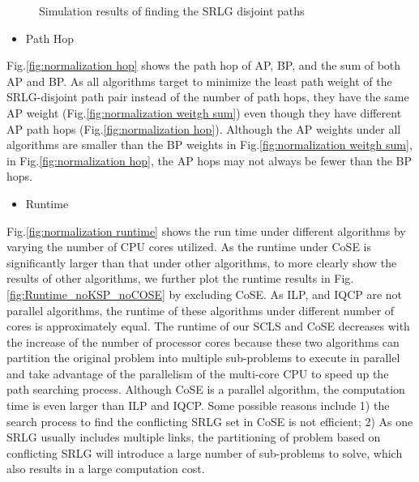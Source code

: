 \begin{figure}[tp]
\caption{Simulation results of finding the SRLG disjoint paths}
\label{fig:SLNGExperimentalData}
\end{figure}

\begin{itemize}
  \item Path Hop
\end{itemize}


Fig.\ref{fig:normalization hop} shows the path hop of AP, BP, and the sum of both AP and BP. As all algorithms target to minimize the least path weight of the SRLG-disjoint path pair instead of the number of path hops, they have the same AP weight (Fig.\ref{fig:normalization weitgh sum}) even though they have different AP path hops (Fig.\ref{fig:normalization hop}). Although the AP weights under all algorithms are smaller than the BP weights in Fig.\ref{fig:normalization weitgh sum}, in Fig.\ref{fig:normalization hop}, the AP hops may not always be fewer than the BP hops.

\begin{itemize}
  \item Runtime
\end{itemize}


\label{subsubsec:Runtime}
Fig.\ref{fig:normalization runtime} shows the run time under different algorithms by varying the number of CPU cores utilized.
As the runtime under CoSE is significantly larger than that under other algorithms, to more clearly show the results of other algorithms, we further plot the runtime results in Fig.\ref{fig:Runtime_noKSP_noCOSE} by excluding CoSE.
As ILP, and IQCP are not parallel algorithms, the runtime of these algorithms under different number of cores is approximately equal. The runtime of our SCLS  and CoSE decreases with the increase of the number of processor cores because these two algorithms can partition the original problem into multiple sub-problems to execute in parallel and take advantage of the parallelism of the multi-core CPU to speed up the path searching process. Although CoSE is a parallel algorithm, the computation time is even larger than  ILP and IQCP. Some possible reasons include 1) the search process to find the conflicting SRLG set in CoSE  is not efficient; 2) As one SRLG usually includes multiple links, the partitioning of problem based on conflicting SRLG will introduce a large number of sub-problems to solve, which also results in a large computation cost.


